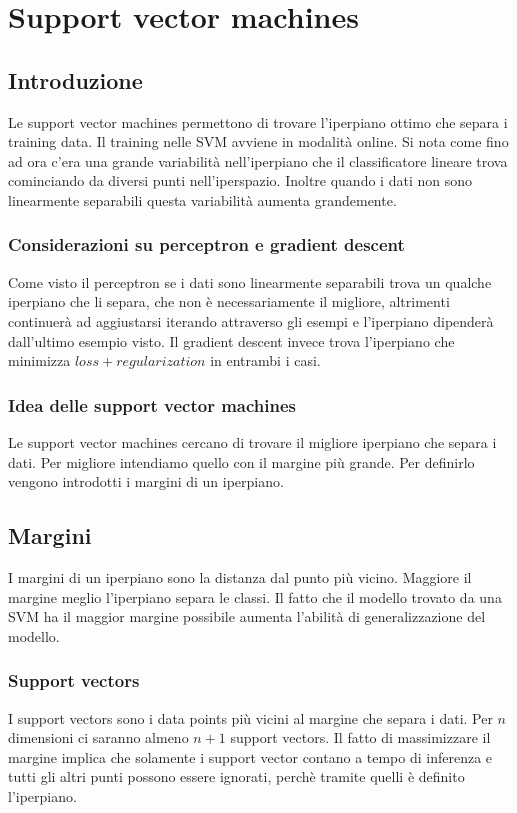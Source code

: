 \chapter{Support vector machines}

\section{Introduzione}
Le support vector machines permettono di trovare l'iperpiano ottimo che separa i training data. 
Il training nelle SVM avviene in modalità online.
Si nota come fino ad ora c'era una grande variabilit\`a nell'iperpiano che il classificatore lineare trova cominciando da diversi punti nell'iperspazio.
Inoltre quando i dati non sono linearmente separabili questa variabilit\`a aumenta grandemente.

	\subsection{Considerazioni su perceptron e gradient descent}
	Come visto il perceptron se i dati sono linearmente separabili trova un qualche iperpiano che li separa, che non \`e necessariamente il migliore, altrimenti continuer\`a ad aggiustarsi iterando attraverso gli esempi e l'iperpiano dipender\`a dall'ultimo esempio visto.
	Il gradient descent invece trova l'iperpiano che minimizza $loss+regularization$ in entrambi i casi.
	
	\subsection{Idea delle support vector machines}
	Le support vector machines cercano di trovare il migliore iperpiano che separa i dati.
	Per migliore intendiamo quello con il margine pi\`u grande.
	Per definirlo vengono introdotti i margini di un iperpiano.

\section{Margini}
I margini di un iperpiano sono la distanza dal punto pi\`u vicino.
Maggiore il margine meglio l'iperpiano separa le classi.
Il fatto che il modello trovato da una SVM ha il maggior margine possibile aumenta l'abilit\`a di generalizzazione del modello.

	\subsection{Support vectors}
	I support vectors sono i data points pi\`u vicini al margine che separa i dati.
	Per $n$ dimensioni ci saranno almeno $n+1$ support vectors.
	Il fatto di massimizzare il margine implica che solamente i support vector contano a tempo di inferenza e tutti gli altri punti possono essere ignorati, perch\`e tramite quelli \`e definito l'iperpiano.
	
